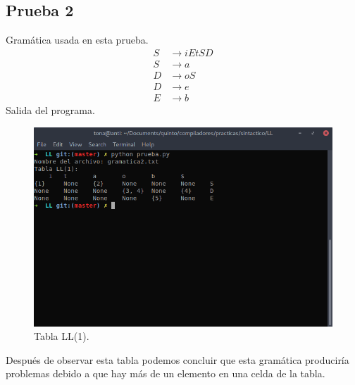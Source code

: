 \documentclass[12pt, titlepage]{article}
\begin{document}
    \subsection{Prueba 2}
    Gramática usada en esta prueba.
    \setcounter{equation}{0}
    \begin{align}
        S &\rightarrow iEtSD \\
        S &\rightarrow a \\
        D &\rightarrow oS \\
        D &\rightarrow e \\
        E &\rightarrow b
    \end{align}
    Salida del programa.
    \begin{figure}[H]
        \begin{center}
            \includegraphics[width=15cm]{gramatica2.png}
            \caption{Tabla LL(1).}
            \label{fig:prueba2}
        \end{center}
    \end{figure}
    Después de observar esta tabla podemos concluir que esta gramática 
produciría problemas debido a que hay más de un elemento en una celda de la 
tabla.
\end{document}

